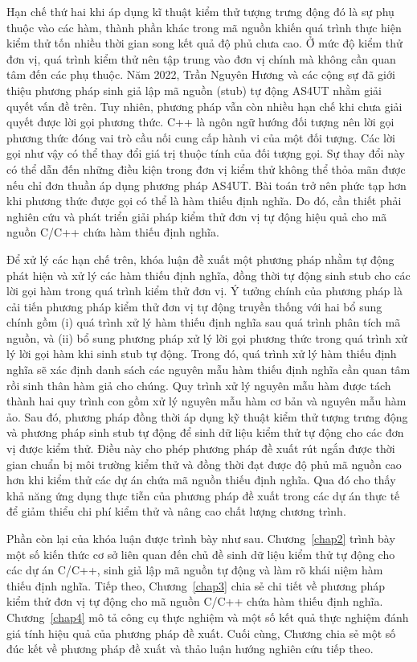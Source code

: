 Hạn chế thứ hai khi áp dụng kĩ thuật kiểm thử tượng trưng động đó là sự phụ thuộc vào các hàm, thành phần khác trong mã nguồn khiến quá trình thực hiện kiểm thử tốn nhiều thời gian song kết quả độ phủ chưa cao. Ở mức độ kiểm thử đơn vị, quá trình kiểm thử nên tập trung vào đơn vị chính mà không cần quan tâm đến các phụ thuộc. Năm 2022, Trần Nguyên Hương và các cộng sự đã giới thiệu phương pháp sinh giả lập mã nguồn (stub) tự động AS4UT \cite{TUNG2022106821} nhằm giải quyết vấn đề trên. Tuy nhiên, phương pháp vẫn còn nhiều hạn chế khi chưa giải quyết được lời gọi phương thức. C++ là ngôn ngữ hướng đối tượng nên lời gọi phương thức đóng vai trò cầu nối cung cấp hành vi của một đối tượng. Các lời gọi như vậy có thể thay đổi giá trị thuộc tính của đối tượng gọi. Sự thay đổi này có thể dẫn đến những điều kiện trong đơn vị kiểm thử không thể thỏa mãn được nếu chỉ đơn thuần áp dụng phương pháp AS4UT. Bài toán trở nên phức tạp hơn khi phương thức được gọi có thể là hàm thiếu định nghĩa. Do đó, cần thiết phải nghiên cứu và phát triển giải pháp kiểm thử đơn vị tự động hiệu quả cho mã nguồn C/C++ chứa hàm thiếu định nghĩa. 

Để xử lý các hạn chế trên, khóa luận đề xuất một phương pháp nhằm tự động phát hiện và xử lý các hàm thiếu định nghĩa, đồng thời tự động sinh stub cho các lời gọi hàm trong quá trình kiểm thử đơn vị. Ý tưởng chính của phương pháp là cải tiến phương pháp kiểm thử đơn vị tự động truyền thống với hai bổ sung chính gồm (i) quá trình xử lý hàm thiếu định nghĩa sau quá trình phân tích mã nguồn, và (ii) bổ sung phương pháp xử lý lời gọi phương thức trong quá trình xử lý lời gọi hàm khi sinh stub tự động. Trong đó, quá trình xử lý hàm thiếu định nghĩa sẽ xác định danh sách các nguyên mẫu hàm thiếu định nghĩa cần quan tâm rồi sinh thân hàm giả cho chúng. Quy trình xử lý nguyên mẫu hàm được tách thành hai quy trình con gồm xử lý nguyên mẫu hàm cơ bản và nguyên mẫu hàm ảo. Sau đó, phương pháp đồng thời áp dụng kỹ thuật kiểm thử tượng trưng động và phương pháp sinh stub tự động để sinh dữ liệu kiểm thử tự động cho các đơn vị được kiểm thử. Điều này cho phép phương pháp đề xuất rút ngắn được thời gian chuẩn bị môi trường kiểm thử và đồng thời đạt được độ phủ mã nguồn cao hơn khi kiểm thử các dự án chứa mã nguồn thiếu định nghĩa. Qua đó cho thấy khả năng ứng dụng thực tiễn của phương pháp đề xuất trong các dự án thực tế để giảm thiểu chi phí kiểm thử và nâng cao chất lượng chương trình.

Phần còn lại của khóa luận được trình bày như sau. Chương~\ref{chap2} trình bày một số kiến thức cơ sở liên quan đến chủ đề sinh dữ liệu kiểm thử tự động cho các dự án C/C++, sinh giả lập mã nguồn tự động và làm rõ khái niệm hàm thiếu định nghĩa. Tiếp theo, Chương~\ref{chap3} chia sẻ chi tiết về phương pháp kiểm thử đơn vị tự động cho mã nguồn C/C++ chứa hàm thiếu định nghĩa. Chương~\ref{chap4} mô tả công cụ thực nghiệm và một số kết quả thực nghiệm đánh giá tính hiệu quả của phương pháp đề xuất. Cuối cùng, Chương  chia sẻ một số đúc kết về phương pháp đề xuất và thảo luận hướng nghiên cứu tiếp theo.